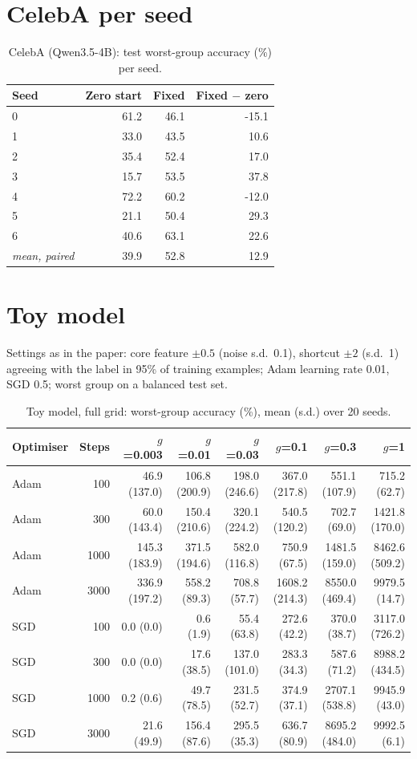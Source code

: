 \documentclass[10pt]{article}
\begin{document}
\section{CelebA per seed}
\begin{longtable}{lrrr}
\caption{CelebA (Qwen3.5-4B): test worst-group accuracy (\%) per seed.}\label{tab:s-celeba}\\
\toprule
Seed & Zero start & Fixed & Fixed $-$ zero \\ \midrule
\endhead
0 & 61.2 & 46.1 & -15.1 \\
1 & 33.0 & 43.5 & 10.6 \\
2 & 35.4 & 52.4 & 17.0 \\
3 & 15.7 & 53.5 & 37.8 \\
4 & 72.2 & 60.2 & -12.0 \\
5 & 21.1 & 50.4 & 29.3 \\
6 & 40.6 & 63.1 & 22.6 \\
\textit{mean, paired} & 39.9 & 52.8 & 12.9 \\
\bottomrule
\end{longtable}

\section{Toy model}
Settings as in the paper: core feature $\pm 0.5$ (noise s.d.\ 0.1), shortcut $\pm 2$ (s.d.\ 1) agreeing with the label in 95\% of training examples; Adam learning rate 0.01, SGD 0.5; worst group on a balanced test set.
\begin{longtable}{lrrrrrrr}
\caption{Toy model, full grid: worst-group accuracy (\%), mean (s.d.) over 20 seeds.}\label{tab:s-toy}\\
\toprule
Optimiser & Steps & $g$=0.003 & $g$=0.01 & $g$=0.03 & $g$=0.1 & $g$=0.3 & $g$=1 \\ \midrule
\endhead
Adam & 100 & 46.9 (137.0) & 106.8 (200.9) & 198.0 (246.6) & 367.0 (217.8) & 551.1 (107.9) & 715.2 (62.7) \\
Adam & 300 & 60.0 (143.4) & 150.4 (210.6) & 320.1 (224.2) & 540.5 (120.2) & 702.7 (69.0) & 1421.8 (170.0) \\
Adam & 1000 & 145.3 (183.9) & 371.5 (194.6) & 582.0 (116.8) & 750.9 (67.5) & 1481.5 (159.0) & 8462.6 (509.2) \\
Adam & 3000 & 336.9 (197.2) & 558.2 (89.3) & 708.8 (57.7) & 1608.2 (214.3) & 8550.0 (469.4) & 9979.5 (14.7) \\
SGD & 100 & 0.0 (0.0) & 0.6 (1.9) & 55.4 (63.8) & 272.6 (42.2) & 370.0 (38.7) & 3117.0 (726.2) \\
SGD & 300 & 0.0 (0.0) & 17.6 (38.5) & 137.0 (101.0) & 283.3 (34.3) & 587.6 (71.2) & 8988.2 (434.5) \\
SGD & 1000 & 0.2 (0.6) & 49.7 (78.5) & 231.5 (52.7) & 374.9 (37.1) & 2707.1 (538.8) & 9945.9 (43.0) \\
SGD & 3000 & 21.6 (49.9) & 156.4 (87.6) & 295.5 (35.3) & 636.7 (80.9) & 8695.2 (484.0) & 9992.5 (6.1) \\
\bottomrule
\end{longtable}
\end{document}
